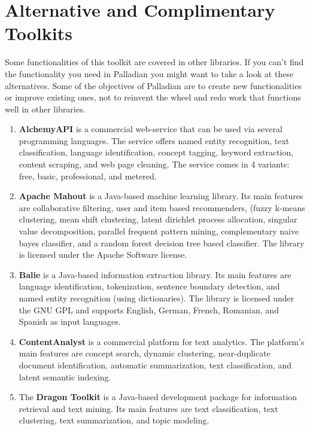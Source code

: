 \documentclass[a4paper,twoside]{book}      %
\begin{document}
\section{Alternative and Complimentary Toolkits}
\label{sec:alternativesToPalladian}
Some functionalities of this toolkit are covered in other libraries. If you can't find the functionality you need in Palladian you might want to take a look at these alternatives. Some of the objectives of Palladian are to create new functionalities or improve existing ones, not to reinvent the wheel and redo work that functions well in other libraries.

\begin{enumerate}
\item \textbf{AlchemyAPI} \cite{alchemyapi} is a commercial web-service that can be used via several programming languages. The service offers named entity recognition, text classification, language identification, concept tagging, keyword extraction, content scraping, and web page cleaning.
The service comes in 4 variants: free, basic, professional, and metered.
\item \textbf{Apache Mahout} \cite{settings2apache} is a Java-based machine learning library. Its main features are collaborative filtering, user and item based recommenders, (fuzzy k-means clustering, mean shift clustering, latent dirichlet process allocation, singular value decomposition, parallel frequent pattern mining, complementary naive bayes classifier, and a random forest decision tree based classifier.
The library is licensed under the Apache Software license.
\item \textbf{Balie} \cite{balie} is a Java-based information extraction library. Its main features are language identification, tokenization, sentence boundary detection, and named entity recognition (using dictionaries).
The library is licensed under the GNU GPL and supports English, German, French, Romanian, and Spanish as input languages.
\item \textbf{ContentAnalyst} \cite{contentanalyst} is a commercial platform for text analytics. The platform's main features are concept search, dynamic clustering, near-duplicate document identification, automatic summarization, text classification, and latent semantic indexing.
\item The \textbf{Dragon Toolkit} \cite{zhou2007dragon} is a Java-based development package for information retrieval and text mining. Its main features are text classification, text clustering, text summarization, and topic modeling.

\end{enumerate}
\end{document}
